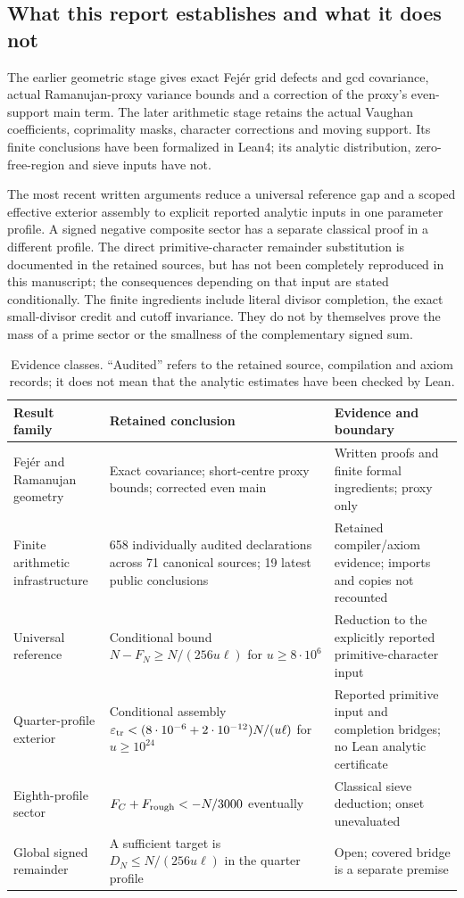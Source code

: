 \documentclass[11pt,a4paper]{article}
\theoremstyle{definition}
\theoremstyle{remark}
\begin{document}
\subsection{What this report establishes and what it does not}
The earlier geometric stage gives exact Fej\'er grid defects and gcd covariance, actual Ramanujan-proxy variance bounds and a correction of the proxy's even-support main term. The later arithmetic stage retains the actual Vaughan coefficients, coprimality masks, character corrections and moving support. Its finite conclusions have been formalized in Lean4; its analytic distribution, zero-free-region and sieve inputs have not.

The most recent written arguments reduce a universal reference gap and a scoped effective exterior assembly to explicit reported analytic inputs in one parameter profile. A signed negative composite sector has a separate classical proof in a different profile. The direct primitive-character remainder substitution is documented in the retained sources, but has not been completely reproduced in this manuscript; the consequences depending on that input are stated conditionally. The finite ingredients include literal divisor completion, the exact small-divisor credit and cutoff invariance. They do not by themselves prove the mass of a prime sector or the smallness of the complementary signed sum.

\begin{table}[htbp]\centering\small
\begin{tabularx}{\textwidth}{@{}P{.24\textwidth}XP{.23\textwidth}@{}}\toprule
Result family & Retained conclusion & Evidence and boundary\\\midrule
Fej\'er and Ramanujan geometry & Exact covariance; short-centre proxy bounds; corrected even main & Written proofs and finite formal ingredients; proxy only\\
Finite arithmetic infrastructure & 658 individually audited declarations across 71 canonical sources; 19 latest public conclusions & Retained compiler/axiom evidence; imports and copies not recounted\\
Universal reference & Conditional bound $N-F_N\ge N/(256u\ell)$ for $u\ge8\cdot10^6$ & Reduction to the explicitly reported primitive-character input\\
Quarter-profile exterior & Conditional assembly $\varepsilon_{\rm tr}<(8\cdot10^{-6}+2\cdot10^{-12})N/(u\ell)$ for $u\ge10^{24}$ & Reported primitive input and completion bridges; no Lean analytic certificate\\
Eighth-profile sector & $F_C+F_{\rm rough}<-N/3000$ eventually & Classical sieve deduction; onset unevaluated\\
Global signed remainder & A sufficient target is $D_N\le N/(256u\ell)$ in the quarter profile & Open; covered bridge is a separate premise\\\bottomrule
\end{tabularx}
\caption{Evidence classes. ``Audited'' refers to the retained source, compilation and axiom records; it does not mean that the analytic estimates have been checked by Lean.}\label{tab:results}
\end{table}
\end{document}
